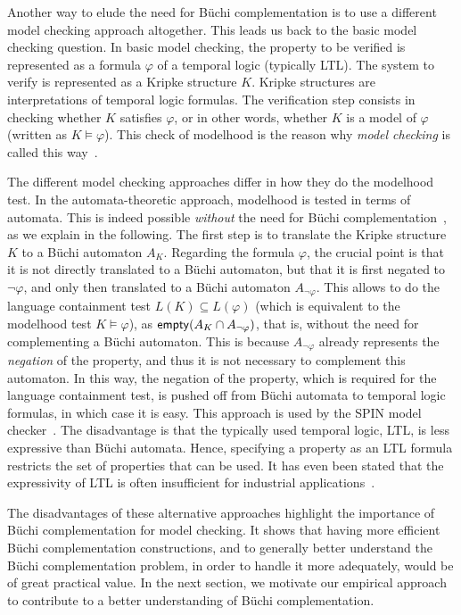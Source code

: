 Another way to elude the need for Büchi complementation is to use a different model checking approach altogether. This leads us back to the basic model checking question. In basic model checking, the property to be verified is represented as a formula $\varphi$ of a temporal logic (typically LTL). The system to verify is represented as a Kripke structure $K$. Kripke structures are interpretations of temporal logic formulas. The verification step consists in checking whether $K$ satisfies $\varphi$, or in other words, whether $K$ is a model of $\varphi$ (written as $K \models \varphi$). This check of modelhood is the reason why \textit{model checking} is called this way~\cite{1996_vardi}.

The different model checking approaches differ in how they do the modelhood test. In the automata-theoretic approach, modelhood is tested in terms of automata. This is indeed possible \textit{without} the need for Büchi complementation~\cite{2007_vardi_model_checking}, as we explain in the following. The first step is to translate the Kripke structure $K$ to a Büchi automaton $A_K$. Regarding the formula $\varphi$, the crucial point is that it is not directly translated to a Büchi automaton, but that it is first negated to $\neg\varphi$, and only then translated to a Büchi automaton $A_{\neg\varphi}$. This allows to do the language containment test $L(K) \subseteq L(\varphi)$ (which is equivalent to the modelhood test $K \models \varphi$), as $\text{\textsf{empty}}(A_K \cap A_{\neg\varphi})$, that is, without the need for  complementing a Büchi automaton. This is because $A_{\neg\varphi}$ already represents the \textit{negation} of the property, and thus it is not necessary to complement this automaton. In this way, the negation of the property, which is required for the language containment test, is pushed off from Büchi automata to temporal logic formulas, in which case it is easy. This approach is used  by the SPIN model checker~\cite{1997_spin}. The disadvantage is that the typically used temporal logic, LTL, is less expressive than Büchi automata. Hence, specifying a property as an LTL formula restricts the set of properties that can be used. It has even been stated that the expressivity of LTL is often insufficient for industrial applications~\cite{2007_vardi_model_checking}.

The disadvantages of these alternative approaches highlight the importance of Büchi complementation for model checking. It shows that having more efficient Büchi complementation constructions, and to generally better understand the Büchi complementation problem, in order to handle it more adequately, would be of great practical value. In the next section, we motivate our empirical approach to contribute to a better understanding of Büchi complementation.


